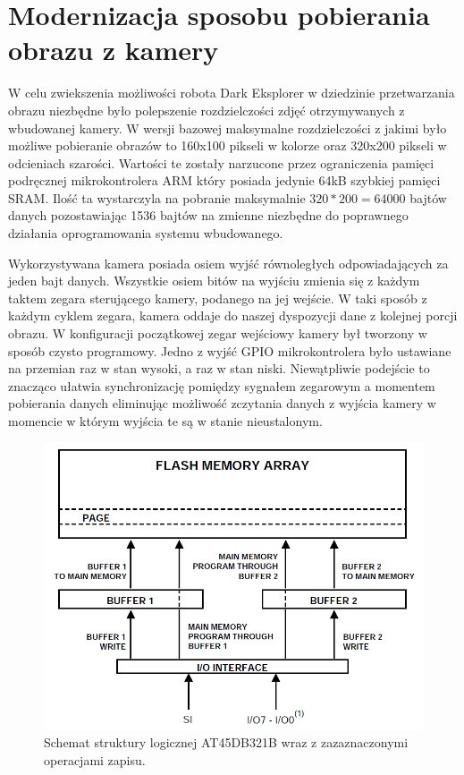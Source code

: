 \section{Modernizacja sposobu pobierania obrazu z kamery} 
\label{sec:img-acq}
W celu zwiekszenia możliwości robota Dark Eksplorer w dziedzinie przetwarzania obrazu niezbędne było polepszenie rozdzielczości zdjęć otrzymywanych z wbudowanej kamery. W wersji bazowej maksymalne rozdzielczości z jakimi było możliwe pobieranie obrazów to 160x100 pikseli w kolorze oraz 320x200 pikseli w odcieniach szarości. Wartości te zostały narzucone przez ograniczenia pamięci podręcznej mikrokontrolera ARM który posiada jedynie 64kB szybkiej pamięci SRAM. Ilość ta wystarczyla na pobranie maksymalnie $320*200=64000$ bajtów danych pozostawiając 1536 bajtów na zmienne niezbędne do poprawnego działania oprogramowania systemu wbudowanego.

Wykorzystywana kamera posiada osiem wyjść równoległych odpowiadających za jeden bajt danych. Wszystkie osiem bitów na wyjściu zmienia się z każdym taktem zegara sterującego kamery, podanego na jej wejście. W taki sposób z każdym cyklem  zegara, kamera oddaje do naszej dyspozycji dane z kolejnej porcji obrazu. W konfiguracji początkowej zegar wejściowy kamery był tworzony w sposób czysto programowy. Jedno z wyjść GPIO mikrokontrolera było ustawiane na przemian raz w stan wysoki, a raz w stan niski. Niewątpliwie podejście to znacząco ułatwia synchronizację pomiędzy sygnałem zegarowym a momentem pobierania danych eliminując możliwość zczytania danych z wyjścia kamery w momencie w którym wyjścia te są w stanie nieustalonym.

\begin{figure}[ht!]
 \centering \includegraphics[height=85mm]{../images/ch04/dataflash_structure.png}
 \caption{Schemat struktury logicznej AT45DB321B wraz z zazaznaczonymi operacjami zapisu\cite{AT45DB321BApplicationNote}.}
 \label{fig:DataFlashStruct}
\end{figure}

